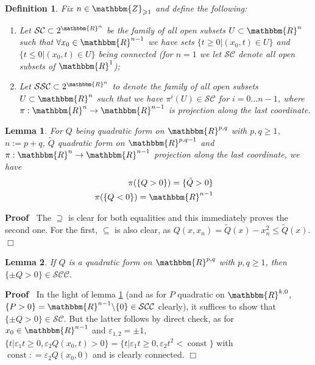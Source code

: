 \documentclass{article}
\newcommand{\assign}{:=}
\newcommand{\tmop}[1]{\ensuremath{\operatorname{#1}}}
\newenvironment{proof}{\noindent\textbf{Proof\ }}{\hspace*{\fill}$\Box$\medskip}
\newtheorem{definition}{Definition}
\numberwithin{definition}{section}
\newtheorem{lemma}{Lemma}
\numberwithin{lemma}{section}
\numberwithin{proposition}{section}
{\theorembodyfont{\rmfamily}\newtheorem{remark}{Remark}
\numberwithin{remark}{section}
}
\begin{document}
\begin{definition}
  Fix $n \in \mathbbm{Z}_{\geqslant 1}$ and define the following:
  \begin{enumerate}
    \item Let $\mathcal{S}\mathcal{C} \subset 2^{\mathbbm{R}^n}$ be the family
    of all open subsets $U \subset \mathbbm{R}^n$ such that $\forall x_0 \in
    \mathbbm{R}^{n - 1}$ we have sets $\{ t \geqslant 0 | ( x_0, t) \in U \}$
    and $\{ t \leqslant 0 | ( x_0, t) \in U \}$ being connected (for $n = 1$
    we let $\mathcal{S}\mathcal{C}$ denote all open subsets of
    $\mathbbm{R}^1$);
    
    \item Let $\mathcal{S}\mathcal{S}\mathcal{C} \subset 2^{\mathbbm{R}^n}$ to
    denote the family of all open subsets $U \subset \mathbbm{R}^n$ such that
    we have $\pi^i ( U) \in \mathcal{S}\mathcal{C}$ for $i = 0 \ldots n - 1$,
    where $\pi : \mathbbm{R}^n \rightarrow \mathbbm{R}^{n - 1}$ is projection
    along the last coordinate.
  \end{enumerate}
\end{definition}

\begin{lemma}
  \label{lem67:lem-geom-aux}For $Q$ being quadratic form on $\mathbbm{R}^{p,
  q}$ with $p, q \geqslant 1$, $n \assign p + q$, $\tilde{Q}$ quadratic form
  on $\mathbbm{R}^{p, q - 1}$ and $\pi : \mathbbm{R}^n \rightarrow
  \mathbbm{R}^{n - 1}$ projection along the last coordinate, we have
  \begin{eqnarray*}
    \pi ( \{ Q > 0 \}) = \{ \tilde{Q} > 0 \} &  & \\
    \pi ( \{ Q < 0 \}) =\mathbbm{R}^{n - 1} &  & 
  \end{eqnarray*}
\end{lemma}

\begin{proof}
  The $\supseteq$ is clear for both equalities and this immediately proves the
  second one. For the first, $\subseteq$ is also clear, as $Q ( x, x_n) =
  \tilde{Q} ( x) - x_n^2 \leqslant \tilde{Q} ( x)$.
\end{proof}

\begin{lemma}
  \label{lem67:lem-geom}If $Q$ is a quadratic form on $\mathbbm{R}^{p, q}$
  with $p, q \geqslant 1$, then $\{ \pm Q > 0 \} \in
  \mathcal{S}\mathcal{C}\mathcal{C}$.
\end{lemma}

\begin{proof}
  In the light of lemma \ref{lem67:lem-geom-aux} (and as for $P$ quadratic on
  $\mathbbm{R}^{k, 0}$, $\{ P > 0 \} =\mathbbm{R}^{n - 1} \backslash \{ 0 \}
  \in \mathcal{S}\mathcal{C}\mathcal{C}$ clearly), it suffices to show that
  $\{ \pm Q > 0 \} \in \mathcal{S}\mathcal{C}$. But the latter follows by
  direct check, as for $x_0 \in \mathbbm{R}^{n - 1}$ and $\varepsilon_{1, 2} =
  \pm 1$, $\{ t | \varepsilon_1 t \geqslant 0, \varepsilon_2 Q ( x_0, t) > 0
  \} = \{ t | \varepsilon_1 t \geqslant 0, \varepsilon_2 t^2 < \tmop{const}
  \}$ with $\tmop{const} : = \varepsilon_2 Q ( x_0, 0)$ and is clearly
  connected.
\end{proof}
\end{document}
